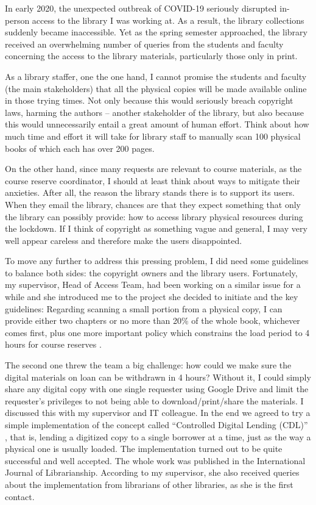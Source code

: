 \documentclass[12pt,a4paper]{article}
\begin{document}
% 

In early 2020, the unexpected outbreak of COVID-19 seriously disrupted in-person access to the library I was working at. As a result, the library collections suddenly became inaccessible. Yet as the spring semester approached, the library received an overwhelming number of queries from the students and faculty concerning the access to the library materials, particularly those only in print.


As a library staffer, one the one hand, I cannot promise the students and faculty (the main stakeholders) that all the physical copies will be made available online in those trying times. Not only because this would seriously breach copyright laws, harming the authors – another stakeholder of the library, but also because this would unnecessarily entail a great amount of human effort. Think about how much time and effort it will take for library staff to manually scan 100 physical books of which each has over 200 pages.


On the other hand, since many requests are relevant to course materials, as the course reserve coordinator, I should at least think about ways to mitigate their anxieties. After all, the reason the library stands there is to support its users. When they email the library, chances are that they expect something that only the library can possibly provide: how to access library physical resources during the lockdown. If I think of copyright as something vague and general, I may very well appear careless and therefore make the users disappointed.


To move any further to address this pressing problem, I did need some guidelines to balance both sides: the copyright owners and the library users. Fortunately, my supervisor, Head of Access Team, had been working on a similar issue for a while and she introduced me to the project she decided to initiate and the key guidelines: Regarding scanning a small portion from a physical copy, I can provide either two chapters or no more than 20\% of the whole book, whichever comes first, plus one more important policy which constrains the load period to 4 hours for course reserves \parencite{NYUSHLIB}.


The second one threw the team a big challenge: how could we make sure the digital materials on loan can be withdrawn in 4 hours? Without it, I could simply share any digital copy with one single requester using Google Drive and limit the requester’s privileges to not being able to download/print/share the materials. I discussed this with my supervisor and IT colleague. In the end we agreed to try a simple implementation of the concept called “Controlled Digital Lending (CDL)” \parencite{controlled}, that is, lending a digitized copy to a single borrower at a time, just as the way a physical one is usually loaded. The implementation turned out to be quite successful and well accepted. The whole work \parencite{cdl} was published in the International Journal of Librarianship. According to my supervisor, she also received queries about the implementation from librarians of other libraries, as she is the first contact.
\end{document}
